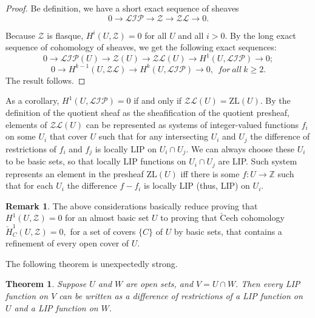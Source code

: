 \documentclass[10pt]{article}
\newtheorem{theorem}{Theorem}
\theoremstyle{definition}
\newtheorem{remark}{Remark}
\begin{document}
\begin{proof}
Be definition, we have a short exact sequence of sheaves
$$0\to \mathcal{LIP}\to \mathcal{Z}\to \mathcal{ZL}\to 0.$$

Because $\mathcal{Z}$ is flasque, $H^i(U,\mathcal {Z})=0$  for all $U$ and all $i>0.$ By the long exact sequence of cohomology of sheaves, we get the following exact sequences:
$$0\to \mathcal{LIP}(U) \to \mathcal{Z} (U) \to \mathcal{ZL}(U) \to H^1(U,\mathcal {LIP}) \to 0; $$
$$0\to  H^{k-1}(U,\mathcal {ZL}) \to H^k(U,\mathcal {LIP}) \to 0, \ \ for\ all\  k \geq 2.$$
The result follows.
\end{proof}

As a corollary, $H^1(U,\mathcal {LIP})=0$ if and only if $\mathcal{ZL}(U) = \textrm{ZL}(U)$. By the definition of the quotient sheaf as the sheafification of the quotient presheaf, elements of $\mathcal{ZL}(U)$ can be represented as systems of integer-valued functions $f_i$ on some $U_i$ that cover $U$ such that for any intersecting $U_i$ and $U_j$ the difference of restrictions of $f_i$ and $f_j$ is locally LIP on $U_i\cap U_j.$ We can always choose these $U_i$ to be basic sets, so that locally LIP functions on $U_i\cap U_j$ are LIP. Such system represents an element in the presheaf $\textrm{ZL}(U)$ iff there is some $f: U\to \mathbb Z$ such that for each $U_i$ the difference $f-f_i$ is locally LIP (thus, LIP) on $U_i.$



\begin{remark}The above considerations basically reduce proving that $H^1 (U,\mathcal {Z})=0$  for an almost basic set $U$  to proving that  $\check{\textrm{C}}$ech cohomology $\check{H}^1_{C} (U,\mathcal {Z})=0,$ for a set of covers $\{C\}$ of $U$ by basic sets, that contains a refinement of every open cover of $U$.
\end{remark}


The following theorem is unexpectedly strong.

\begin{theorem} \label{MainH1} Suppose $U$ and $W$ are open sets, and $V=U\cap W.$ Then every LIP function on $V$ can be written as a difference of restrictions of a LIP function on $U$ and a LIP function on $W.$
\end{theorem}
\end{document}
